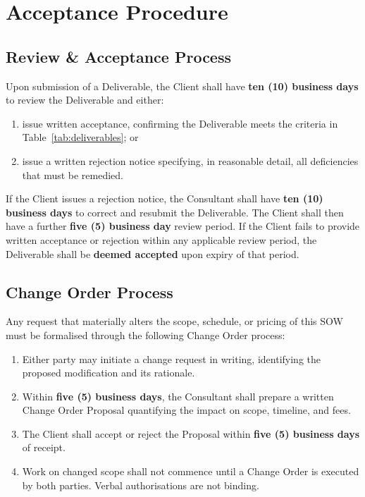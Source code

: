 
\section{Acceptance Procedure}
\label{sec:acceptance}

\subsection{Review \& Acceptance Process}

Upon submission of a Deliverable, the Client shall have \textbf{ten (10) business days}
to review the Deliverable and either:

\begin{enumerate}[label=(\alph*)]
  \item issue written acceptance, confirming the Deliverable meets the criteria in
    Table~\ref{tab:deliverables}; or
  \item issue a written rejection notice specifying, in reasonable detail, all
    deficiencies that must be remedied.
\end{enumerate}

If the Client issues a rejection notice, the Consultant shall have \textbf{ten (10)
business days} to correct and resubmit the Deliverable. The Client shall then have a
further \textbf{five (5) business day} review period. If the Client fails to provide
written acceptance or rejection within any applicable review period, the Deliverable
shall be \textbf{deemed accepted} upon expiry of that period.

\subsection{Change Order Process}
\label{sec:changeorder}

Any request that materially alters the scope, schedule, or pricing of this SOW must be
formalised through the following Change Order process:

\begin{enumerate}
  \item Either party may initiate a change request in writing, identifying the proposed
    modification and its rationale.
  \item Within \textbf{five (5) business days}, the Consultant shall prepare a written
    Change Order Proposal quantifying the impact on scope, timeline, and fees.
  \item The Client shall accept or reject the Proposal within \textbf{five (5) business
    days} of receipt.
  \item Work on changed scope shall not commence until a Change Order is executed by
    both parties. Verbal authorisations are not binding.
\end{enumerate}

